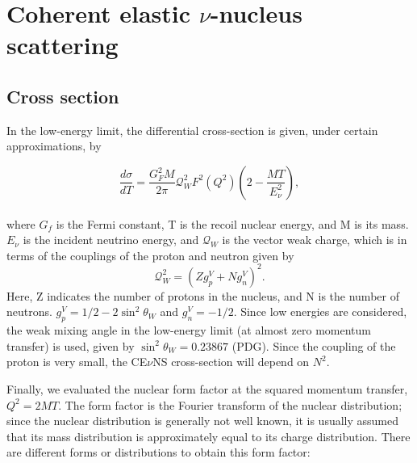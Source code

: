 \chapter{Coherent elastic $\nu$-nucleus scattering}\label{cap:planificación}

\section{Cross section}
In the low-energy limit, the differential cross-section is given, under certain approximations, by

\begin{equation}
    \frac{d\sigma}{dT}=\frac{G_{F}^{2}M}{2\pi}\mathcal{Q}_{W}^2F^2(Q^2)\left(2-\frac{MT}{E_{\nu}^2}\right),
\end{equation}\\
where $G_f$ is the Fermi constant, T is the recoil nuclear energy, and M is its mass. $E_\nu$ is the incident neutrino energy, and $\mathcal{Q}_W$ is the  vector weak charge, which is in terms of the couplings of the proton and neutron given by
\begin{equation}
    \mathcal{Q}_W^2=\left(Z g_p^V+N g_n^V\right)^2.
\end{equation}
Here, Z indicates the number of protons in the nucleus, and N is the number of neutrons. $g_p^V=1/2-2\sin^2\theta_W$ and $g_n^V=-1/2$. Since low energies are considered, the weak mixing angle in the low-energy limit (at almost zero momentum transfer) is used, given by $\sin^2\theta_W=0.23867$ (PDG). Since the coupling of the proton is very small, the CE$\nu$NS cross-section will depend on $N^2$.

Finally, we evaluated the nuclear form factor at the squared momentum transfer, $Q^2=2MT$. The form factor is the Fourier transform of the nuclear distribution; since the nuclear distribution is generally not well known, it is usually assumed that its mass distribution is approximately equal to its charge distribution. There are different forms or distributions to obtain this form factor:

